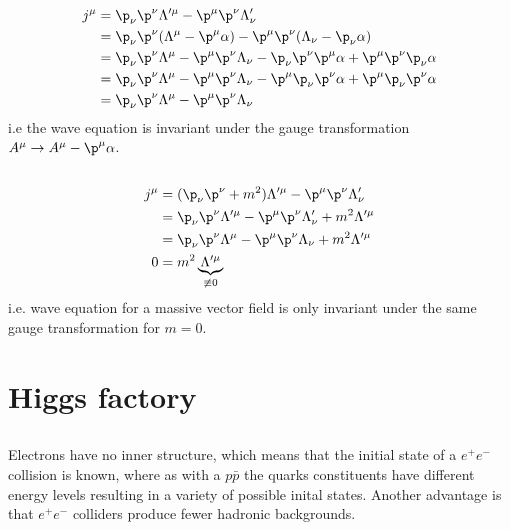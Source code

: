 \documentclass[exb]{exercise_5.0}
\begin{document}
\subsection{}
\begin{align*}
    j^\mu &= \p_\nu \p^\nu \Lambda'^\mu - \p^\mu \p^\nu \Lambda'_\nu\\
     &= \p_\nu \p^\nu (\Lambda^\mu - \p^\mu\alpha) - \p^\mu \p^\nu (\Lambda_\nu - \p_\nu\alpha)\\
     &= \p_\nu \p^\nu \Lambda^\mu - \p^\mu \p^\nu \Lambda_\nu - \p_\nu \p^\nu  \p^\mu\alpha + \p^\mu \p^\nu \p_\nu\alpha\\
     &= \p_\nu \p^\nu \Lambda^\mu - \p^\mu \p^\nu \Lambda_\nu - \p^\mu \p_\nu \p^\nu \alpha + \p^\mu \p_\nu \p^\nu\alpha\\
     &= \p_\nu \p^\nu \Lambda^\mu - \p^\mu \p^\nu \Lambda_\nu
\end{align*}
i.e the wave equation is invariant under the gauge transformation $A^\mu \to A^\mu - \p^\mu \alpha$. 

\subsection{}
\begin{align*}
    j^\mu &= (\p_\nu \p^\nu + m^2) \Lambda'^\mu - \p^\mu \p^\nu \Lambda'_\nu\\
    &= \p_\nu \p^\nu \Lambda'^\mu- \p^\mu \p^\nu \Lambda'_\nu  + m^2 \Lambda'^\mu\\
    &= \p_\nu \p^\nu \Lambda^\mu- \p^\mu \p^\nu \Lambda_\nu  + m^2 \Lambda'^\mu\\
    0 &= m^2 \underbrace{\Lambda'^\mu}_{\not\equiv 0}
\end{align*}
i.e. wave equation for a massive vector field is only invariant under the same gauge transformation for $m=0$.

\section{Higgs factory}
\subsection{}
Electrons have no inner structure, which means that the initial state of a $e^+e^-$ collision is known, where as with a $p\bar p$ the quarks constituents have different energy levels resulting in a variety of possible inital states. Another advantage is that $e^+e^-$ colliders produce fewer hadronic backgrounds.
\end{document}
